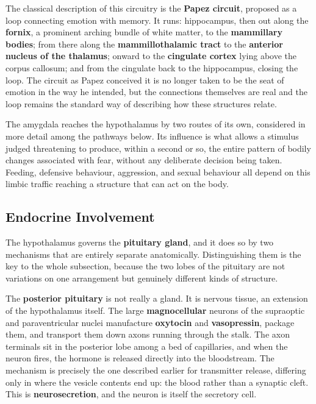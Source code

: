 \documentclass[11pt]{article}
\begin{document}
The classical description of this circuitry is the \textbf{Papez circuit}, proposed as a loop connecting emotion with memory. It runs: hippocampus, then out along the \textbf{fornix}, a prominent arching bundle of white matter, to the \textbf{mammillary bodies}; from there along the \textbf{mammillothalamic tract} to the \textbf{anterior nucleus of the thalamus}; onward to the \textbf{cingulate cortex} lying above the corpus callosum; and from the cingulate back to the hippocampus, closing the loop. The circuit as Papez conceived it is no longer taken to be the seat of emotion in the way he intended, but the connections themselves are real and the loop remains the standard way of describing how these structures relate.

The amygdala reaches the hypothalamus by two routes of its own, considered in more detail among the pathways below. Its influence is what allows a stimulus judged threatening to produce, within a second or so, the entire pattern of bodily changes associated with fear, without any deliberate decision being taken. Feeding, defensive behaviour, aggression, and sexual behaviour all depend on this limbic traffic reaching a structure that can act on the body.

\subsection{Endocrine Involvement}

The hypothalamus governs the \textbf{pituitary gland}, and it does so by two mechanisms that are entirely separate anatomically. Distinguishing them is the key to the whole subsection, because the two lobes of the pituitary are not variations on one arrangement but genuinely different kinds of structure.

The \textbf{posterior pituitary} is not really a gland. It is nervous tissue, an extension of the hypothalamus itself. The large \textbf{magnocellular} neurons of the supraoptic and paraventricular nuclei manufacture \textbf{oxytocin} and \textbf{vasopressin}, package them, and transport them down axons running through the stalk. The axon terminals sit in the posterior lobe among a bed of capillaries, and when the neuron fires, the hormone is released directly into the bloodstream. The mechanism is precisely the one described earlier for transmitter release, differing only in where the vesicle contents end up: the blood rather than a synaptic cleft. This is \textbf{neurosecretion}, and the neuron is itself the secretory cell.
\end{document}
